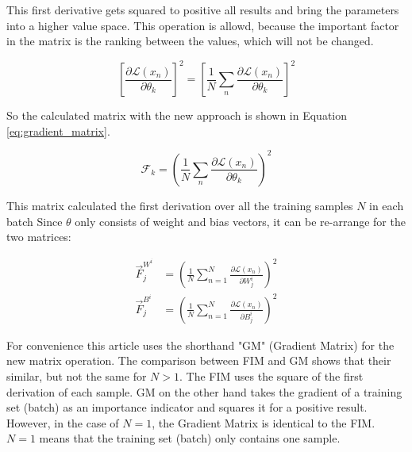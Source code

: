 This first derivative gets squared to positive all results and bring the parameters into a higher value space.
This operation is allowd, because the important factor in the matrix is the ranking between the values, which will not be changed.

\begin{equation}
    \left[
        \frac{\partial \mathcal{L}(x_n)}{\partial \theta_k}
        \right]^2
    = 
    \left[
        \frac{1}{N}
        \sum_{n} 
            \frac{\partial \mathcal{L}(x_n)}{\partial \theta_k}
        \right]^2
\end{equation}

So the calculated matrix with the new approach is shown in Equation \eqref{eq:gradient_matrix}.

\begin{equation}
    \mathcal{F}_k =
    \left(
        \frac{1}{N}
        \sum_{n} 
            \frac{\partial \mathcal{L}(x_n)}{\partial \theta_k}
        \right)^2
    \label{eq:gradient_matrix}
\end{equation}

This matrix calculated the first derivation over all the training samples $N$ in each batch
Since $\theta$ only consists of weight and bias vectors, it can be re-arrange for the two matrices:

\begin{equation}
    \begin{split}
        \vec{F}^{W^i}_j & = 
        \left(
            \frac{1}{N} 
            \sum_{n=1}^{N}
            \frac{\partial \mathcal{L} \left( x_n \right) }{\partial W^i_{j}}
        \right)^2
        \\
        \vec{F}^{B^i}_j & = 
        \left(
            \frac{1}{N} 
            \sum_{n=1}^{N} 
            \frac{\partial \mathcal{L} \left( x_n \right) }{\partial B^i_{j}}
        \right)^2
    \end{split}
\end{equation}

For convenience this article uses the shorthand "GM" (Gradient Matrix) for the new matrix operation.
\newline
The comparison between FIM and GM shows that their similar, but not the same for $N > 1$.
The FIM uses the square of the first derivation of each sample. GM on the other hand takes the gradient of a training set (batch) as an importance indicator and squares it for a positive result.
However, in the case of $N=1$, the Gradient Matrix is identical to the FIM.
$N=1$ means that the training set (batch) only contains one sample.

